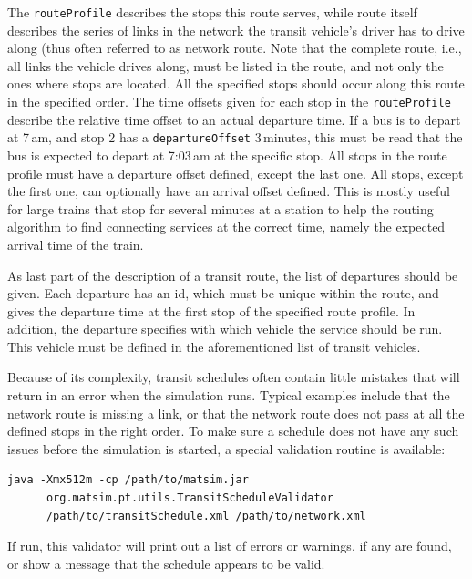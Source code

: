 The \lstinline|routeProfile| describes the stops this route serves, while route itself describes the series of links in the network the transit vehicle's driver has to drive along (thus often referred to as network route. Note that the complete route, i.e.,\,all links the vehicle drives along, must be listed in the route, and not only the ones where stops are located. All the specified stops should occur along this route in the specified order. The time offsets given for each stop in the \lstinline|routeProfile| describe the relative time offset to an actual departure time. If a bus is to depart at 7\,am, and stop 2 has a \lstinline|departureOffset| 3\,minutes, this must be read that the bus is expected to depart at 7:03\,am at the specific stop. All stops in the route profile must have a departure offset defined, except the last one. All stops, except the first one, can optionally have an arrival offset defined. This is mostly useful for large trains that stop for several minutes at a station to help the routing algorithm to find connecting services at the correct time, namely the expected arrival time of the train.

As last part of the description of a transit route, the list of departures should be given. Each departure has an id, which must be unique within the route, and gives the departure time at the first stop of the specified route profile. In addition, the departure specifies with which vehicle the service should be run. This vehicle must be defined in the aforementioned list of transit vehicles. 

Because of its complexity, transit schedules often contain little mistakes that will return in an error when the simulation runs. Typical examples include that the network route is missing a link, or that the network route does not pass at all the defined stops in the right order. To make sure a schedule does not have any such issues before the simulation is started, a special validation routine is available:

\begin{lstlisting}
java -Xmx512m -cp /path/to/matsim.jar  
      org.matsim.pt.utils.TransitScheduleValidator  
      /path/to/transitSchedule.xml /path/to/network.xml
\end{lstlisting}

If run, this validator will print out a list of errors or warnings, if any are found, or show a message that the schedule appears to be valid.

